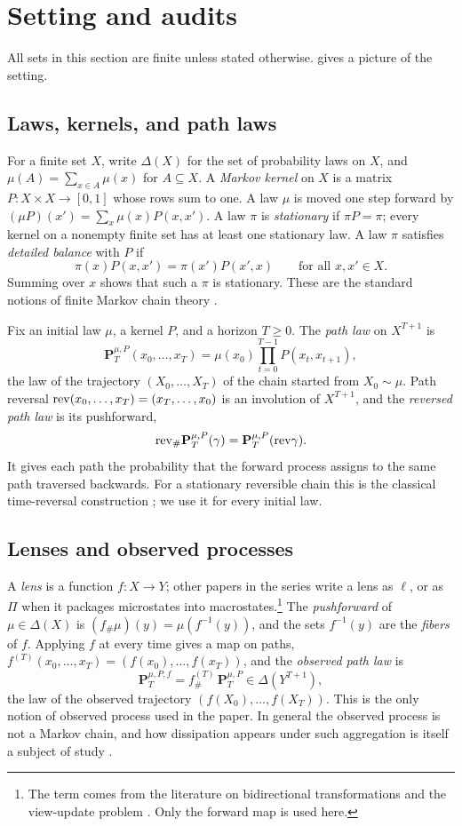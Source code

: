 \section{Setting and audits}\label{sec:setup}

All sets in this section are finite unless stated otherwise.
 gives a picture of the setting.

\subsection{Laws, kernels, and path laws}
For a finite set $X$, write $\Delta(X)$ for the set of probability laws on $X$, and $\mu(A)=\sum_{x\in A}\mu(x)$ for $A\subseteq X$.
A \emph{Markov kernel} on $X$ is a matrix $P:X\times X\to[0,1]$ whose rows sum to one.
A law $\mu$ is moved one step forward by $(\mu P)(x')=\sum_{x}\mu(x)P(x,x')$.
A law $\pi$ is \emph{stationary} if $\pi P=\pi$; every kernel on a nonempty finite set has at least one stationary law.
A law $\pi$ satisfies \emph{detailed balance} with $P$ if
\[
  \pi(x)P(x,x')=\pi(x')P(x',x)\qquad\text{for all }x,x'\in X.
\]
Summing over $x$ shows that such a $\pi$ is stationary.
These are the standard notions of finite Markov chain theory \citep{Norris1997,LevinPeresWilmer2017}.

Fix an initial law $\mu$, a kernel $P$, and a horizon $T\ge 0$.
The \emph{path law} on $X^{T+1}$ is
\[
  \mathbf{P}^{\mu,P}_T(x_0,\dots,x_T)=\mu(x_0)\prod_{t=0}^{T-1}P(x_t,x_{t+1}),
\]
the law of the trajectory $(X_0,\dots,X_T)$ of the chain started from $X_0\sim\mu$.
Path reversal $\mathrm{rev}(x_0,\dots,x_T)=(x_T,\dots,x_0)$ is an involution of $X^{T+1}$, and the \emph{reversed path law} is its pushforward,
\[
  \mathrm{rev}_{\#}\mathbf{P}^{\mu,P}_T(\gamma)=\mathbf{P}^{\mu,P}_T(\mathrm{rev}\gamma).
\]
It gives each path the probability that the forward process assigns to the same path traversed backwards.
For a stationary reversible chain this is the classical time-reversal construction \citep{Kelly1979}; we use it for every initial law.

\subsection{Lenses and observed processes}
A \emph{lens} is a function $f:X\to Y$; other papers in the series write a lens as $\ell$, or as $\Pi$ when it packages microstates into macrostates.\footnote{The term comes from the literature on bidirectional transformations and the view-update problem \citep{FosterEtAl2007}. Only the forward map is used here.}
The \emph{pushforward} of $\mu\in\Delta(X)$ is $(f_{\#}\mu)(y)=\mu(f^{-1}(y))$, and the sets $f^{-1}(y)$ are the \emph{fibers} of $f$.
Applying $f$ at every time gives a map on paths,
$f^{(T)}(x_0,\dots,x_T)=(f(x_0),\dots,f(x_T))$, and the \emph{observed path law} is
\[
  \mathbf{P}^{\mu,P,f}_T=f^{(T)}_{\#}\,\mathbf{P}^{\mu,P}_T\in\Delta(Y^{T+1}),
\]
the law of the observed trajectory $(f(X_0),\dots,f(X_T))$.
This is the only notion of observed process used in the paper.
In general the observed process is not a Markov chain, and how dissipation appears under such aggregation is itself a subject of study \citep{Esposito2012}.

